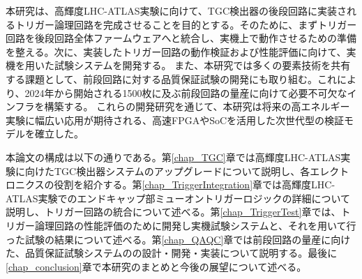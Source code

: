 本研究は、高輝度LHC-ATLAS実験に向けて、TGC検出器の後段回路に実装されるトリガー論理回路を完成させることを目的とする。そのために、まずトリガー回路を後段回路全体ファームウェアへと統合し、実機上で動作させるための準備を整える。次に、実装したトリガー回路の動作検証および性能評価に向けて、実機を用いた試験システムを開発する。
また、本研究では多くの要素技術を共有する課題として、前段回路に対する品質保証試験の開発にも取り組む。これにより、2024年から開始される1500枚に及ぶ前段回路の量産に向けて必要不可欠なインフラを構築する。
これらの開発研究を通じて、本研究は将来の高エネルギー実験に幅広い応用が期待される、高速FPGAやSoCを活用した次世代型の検証モデルを確立した。

本論文の構成は以下の通りである。第\ref{chap_TGC}章では高輝度LHC-ATLAS実験に向けたTGC検出器システムのアップグレードについて説明し、各エレクトロニクスの役割を紹介する。第\ref{chap_TriggerIntegration}章では高輝度LHC-ATLAS実験でのエンドキャップ部ミューオントリガーロジックの詳細について説明し、トリガー回路の統合について述べる。第\ref{chap_TriggerTest}章では、トリガー論理回路の性能評価のために開発し実機試験システムと、それを用いて行った試験の結果について述べる。第\ref{chap_QAQC}章では前段回路の量産に向けた、品質保証試験システムのの設計・開発・実装について説明する。最後に\ref{chap_conclusion}章で本研究のまとめと今後の展望について述べる。